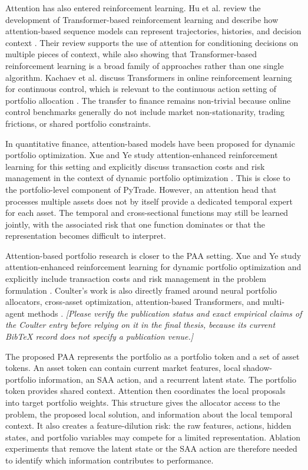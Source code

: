 Attention has also entered reinforcement learning. Hu et al. review the development of Transformer-based reinforcement learning and describe how attention-based sequence models can represent trajectories, histories, and decision context \cite{Hu.2024}. Their review supports the use of attention for conditioning decisions on multiple pieces of context, while also showing that Transformer-based reinforcement learning is a broad family of approaches rather than one single algorithm. Kachaev et al. discuss Transformers in online reinforcement learning for continuous control, which is relevant to the continuous action setting of portfolio allocation \cite{NikitaKachaev.2025}. The transfer to finance remains non-trivial because online control benchmarks generally do not include market non-stationarity, trading frictions, or shared portfolio constraints.

In quantitative finance, attention-based models have been proposed for dynamic portfolio optimization. Xue and Ye study attention-enhanced reinforcement learning for this setting and explicitly discuss transaction costs and risk management in the context of dynamic portfolio optimization \cite{Xue.2026}. This is close to the portfolio-level component of PyTrade. However, an attention head that processes multiple assets does not by itself provide a dedicated temporal expert for each asset. The temporal and cross-sectional functions may still be learned jointly, with the associated risk that one function dominates or that the representation becomes difficult to interpret.

Attention-based portfolio research is closer to the PAA setting. Xue and Ye study attention-enhanced reinforcement learning for dynamic portfolio optimization and explicitly include transaction costs and risk management in the problem formulation \cite{Xue.2026}. Coulter's work is also directly framed around neural portfolio allocators, cross-asset optimization, attention-based Transformers, and multi-agent methods \cite{NathanielCoulter.2025}. \textit{[Please verify the publication status and exact empirical claims of the Coulter entry before relying on it in the final thesis, because its current BibTeX record does not specify a publication venue.]}

The proposed PAA represents the portfolio as a portfolio token and a set of asset tokens. An asset token can contain current market features, local shadow-portfolio information, an SAA action, and a recurrent latent state. The portfolio token provides shared context. Attention then coordinates the local proposals into target portfolio weights. This structure gives the allocator access to the problem, the proposed local solution, and information about the local temporal context. It also creates a feature-dilution risk: the raw features, actions, hidden states, and portfolio variables may compete for a limited representation. Ablation experiments that remove the latent state or the SAA action are therefore needed to identify which information contributes to performance.

